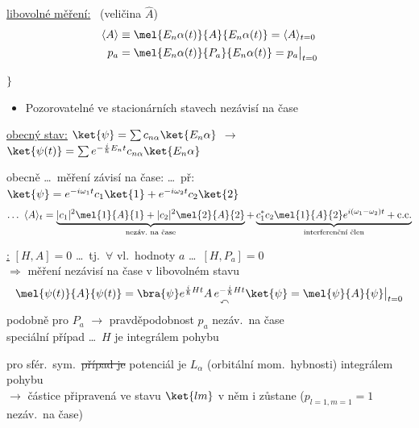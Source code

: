 \begin{minipage}{0.75\textwidth}
\underline{libovolné měření:} \ (veličina $\hat A$)
\begin{align*}
  \langle A\rangle &\equiv \mel{E_n\alpha(t)}{A}{E_n\alpha(t)} = \langle A\rangle_{t=0} \\
  p_a &= \mel{E_n\alpha(t)}{P_a}{E_n\alpha(t)} = p_a\big|_{t=0}
\end{align*}
\end{minipage}
\begin{minipage}{0.22\textwidth}
$\Bigg\}$ \ 
\end{minipage}

\begin{veta}
\begin{itemize}[nosep]
  \item Pozorovatelné ve stacionárních stavech nezávisí na čase
\end{itemize}
\end{veta}

\underline{obecný stav:} \quad $\ket{\psi} = \sum c_{n\alpha}\ket{E_n\alpha}$ \quad $\to$ \quad
$\ket{\psi(t)} = \sum e^{-\frac{i}{\hbar}E_nt}c_{n\alpha}\ket{E_n\alpha}$

obecně \dots\ měření závisí na čase: \quad \dots\ př: $\ket{\psi} = e^{-i\omega_1t}c_1\ket{1} + e^{-i\omega_2t}c_2\ket{2}$
\[
  \dots\ \langle A\rangle_t = \underbrace{|c_1|^2\mel{1}{A}{1} + |c_2|^2\mel{2}{A}{2}}_{\text{nezáv.\ na čase}}
  + \underbrace{c_1^*c_2\mel{1}{A}{2}e^{i(\omega_1-\omega_2)t} + \text{c.c.}}_{\text{interferenční člen}}
\]

\underline{:} \quad $[H,A] = 0$ \quad \dots\ tj.\ $\forall$ vl.\ hodnoty $a$ \dots\ $[H,P_a] = 0$ \\
$\Rightarrow$ měření nezávisí na čase v libovolném stavu
\[
  \mel{\psi(t)}{A}{\psi(t)} = \bra{\psi}e^{\frac{i}{\hbar}Ht}\underset{\curvearrowleft}{A\,e^{-\frac{i}{\hbar}Ht}}\ket{\psi} = \mel{\psi}{A}{\psi}\big|_{t=0}
\]
podobně pro $P_a$ $\to$ pravděpodobnost $p_a$ nezáv.\ na čase \\
speciální případ \dots\ $H$ je integrálem pohybu

\begin{priklad}[PŘ]
pro sfér.\ sym.\ \sout{případ je} potenciál je $L_\alpha$ (orbitální mom.\ hybnosti) integrálem pohybu \\
$\to$ částice připravená ve stavu $\ket{lm}$ v něm i zůstane \quad ($p_{l=1,m=1} = 1$ nezáv.\ na čase)
\end{priklad}

